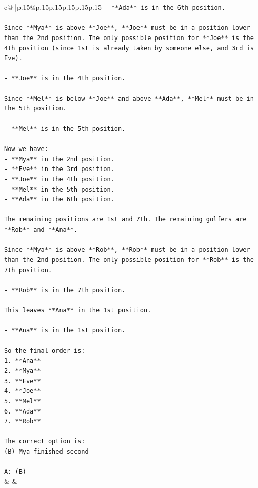 \documentclass{article}
\begin{document}
{\begin{supertabular}{c@{$\;$}|p{.15\linewidth}@{}p{.15\linewidth}p{.15\linewidth}p{.15\linewidth}p{.15\linewidth}p{.15\linewidth}}
{{{\texttt{{-} **Ada** is in the 6th position.} \\
\\ 
\texttt{Since **Mya** is above **Joe**, **Joe** must be in a position lower than the 2nd position. The only possible position for **Joe** is the 4th position (since 1st is already taken by someone else, and 3rd is Eve).} \\
\\ 
\texttt{{-} **Joe** is in the 4th position.} \\
\\ 
\texttt{Since **Mel** is below **Joe** and above **Ada**, **Mel** must be in the 5th position.} \\
\\ 
\texttt{{-} **Mel** is in the 5th position.} \\
\\ 
\texttt{Now we have:} \\
\texttt{{-} **Mya** in the 2nd position.} \\
\texttt{{-} **Eve** in the 3rd position.} \\
\texttt{{-} **Joe** in the 4th position.} \\
\texttt{{-} **Mel** in the 5th position.} \\
\texttt{{-} **Ada** in the 6th position.} \\
\\ 
\texttt{The remaining positions are 1st and 7th. The remaining golfers are **Rob** and **Ana**.} \\
\\ 
\texttt{Since **Mya** is above **Rob**, **Rob** must be in a position lower than the 2nd position. The only possible position for **Rob** is the 7th position.} \\
\\ 
\texttt{{-} **Rob** is in the 7th position.} \\
\\ 
\texttt{This leaves **Ana** in the 1st position.} \\
\\ 
\texttt{{-} **Ana** is in the 1st position.} \\
\\ 
\texttt{So the final order is:} \\
\texttt{1. **Ana**} \\
\texttt{2. **Mya**} \\
\texttt{3. **Eve**} \\
\texttt{4. **Joe**} \\
\texttt{5. **Mel**} \\
\texttt{6. **Ada**} \\
\texttt{7. **Rob**} \\
\\ 
\texttt{The correct option is:} \\
\texttt{(B) Mya finished second} \\
\\ 
\texttt{A: (B)} \\
            }
        }
    }
    & & \\ \\


\end{supertabular}}
\end{document}
